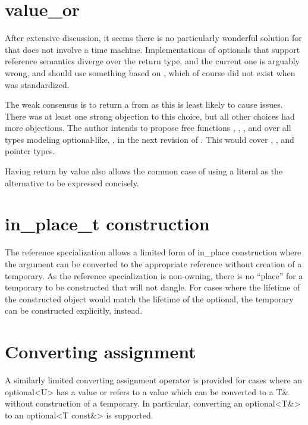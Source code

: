 \documentclass[a4paper,10pt,oneside,openany,final,article]{memoir}
\begin{document}
\section{value_or}

After extensive discussion, it seems there is no particularly wonderful solution for  that does not involve a time machine. Implementations of optionals that support reference semantics diverge over the return type, and the current one is arguably wrong, and should use something based on , which of course did not exist when  was standardized.

The weak consensus is to return a  from  as this is least likely to cause issues. There was at least one strong objection to this choice, but all other choices had more objections. The author intends to propose free functions , , , and  over all types modeling optional-like, , in the next revision of \cite{P1255R12}. This would cover , , and pointer types.

Having  return by value also allows the common case of using a literal as the alternative to be expressed concisely.

\section{in_place_t construction}
The reference specialization allows a limited form of in_place construction where the argument can be converted to the appropriate reference without creation of a temporary. As the reference specialization is non-owning, there is no ``place'' for a temporary to be constructed that will not dangle. For cases where the lifetime of the constructed object would match the lifetime of the optional, the temporary can be constructed explicitly, instead.

\section{Converting assignment}
A similarly limited converting assignment operator is provided for cases where an optional<U> has a value or refers to a value which can be converted to a T\& without construction of a temporary. In particular, converting an optional<T\&> to an optional<T const\&> is supported.
\end{document}
